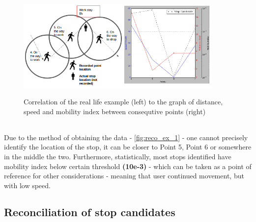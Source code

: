 \begin{figure}[!ht]
	\centering
	\includegraphics[width=0.9\textwidth]{images/reco_example_1.png}\\
	\caption{ Correlation of the real life example (left) to the graph of distance, speed and mobility index between consequtive points (right) }
	\label{fig:reco_ex_1}
\end{figure}
\\
Due to the method of obtaining the data - \autoref{fig:reco_ex_1} - one cannot precisely identify the location of the stop, it can be closer to Point 5, Point 6 or somewhere in the middle the two. Furthermore, statistically, most stops identified have  mobility index below certain threshold \textbf{(10e-3)} - which can be taken as a point of reference for other considerations - meaning that user continued movement, but with low speed.
\FloatBarrier

\subsection{Reconciliation of stop candidates}

